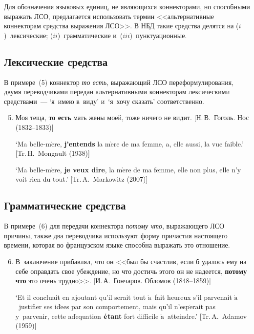 \begin{multicols}{2}
Для обозначения языковых единиц, не являющихся коннекторами, но 
способными выражать ЛСО, предлагается использовать термин 
<<альтернативные коннекторам средства выражения ЛСО>>. В НБД такие 
средства делятся на ($i$)~лексические; ($ii$)~грамматические 
и~($iii$)~пунктуационные.

\subsection{Лексические средства}

В примере~(5) коннектор \textit{то есть}, выражающий ЛСО 
переформулирования, двумя переводчиками передан альтернативными 
коннекторам лексическими средствами~--- `я~имею в~виду' и~`я~хочу 
сказать' соответственно.
{\small 
\begin{enumerate}[(1)]
\setcounter{enumi}{4}
\item 
 Моя теща, \textbf{то есть} мать жены моей, тоже ничего не видит. [Н.\,В.~Гоголь. Нос 
(1832--1833)]

`Ma belle-m$\grave{\mbox{e}}$re, \textbf{j'entends} la m$\grave{\mbox{e}}$re de ma 
femme, a, elle aussi, la vue faible.' [Tr.\,H.~Mongault (1938)]

`Ma belle-m$\grave{\mbox{e}}$re, \textbf{je veux dire}, la m$\grave{\mbox{e}}$re de ma 
femme, elle non plus, elle n'y voit rien du tout.' [Tr.\,A.~Markowitz (2007)]
\end{enumerate}
}

\subsection{Грамматические средства}

В примере~(6) для передачи коннектора \textit{потому что}, выражающего 
ЛСО причины, также два переводчика используют форму причастия 
настоящего времени, которая во французском языке способна выражать это 
отношение.
{\small
\begin{enumerate}[(1)]
\setcounter{enumi}{5}
\item В~заключение прибавлял, что он <<был бы счастлив, если б удалось ему на себе 
оправдать свое убеждение, но что достичь этого он не надеется, \textbf{потому что} это 
очень трудно>>. [И.\,А.~Гончаров. Обломов (1848--1859)]

`Et il concluait en ajoutant qu'il serait tout $\grave{\mbox{a}}$~fait heureux s'il parvenait 
$\grave{\mbox{a}}$~justifier ses id$\acute{\mbox{e}}$es par son comportement, mais qu'il 
n'esp$\acute{\mbox{e}}$rait pas y~parvenir, cette ad$\acute{\mbox{e}}$quation 
$\acute{\mbox{\textbf{e}}}$\textbf{tant} fort difficile $\grave{\mbox{a}}$~atteindre.' 
[Tr.\,A.~Adamov (1959)]


\end{enumerate}}
\end{multicols}
